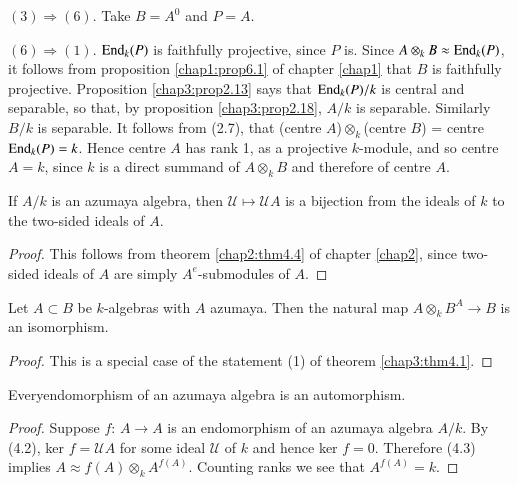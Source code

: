   $(3) \Rightarrow (6)$. Take $B =A^0$ and $P=A$.
  
  $(6) \Rightarrow (1)$. $\operatorname{End}_k (P)$ is faithfully projective, since
  $P$ is. Since $A \otimes_k B \approx \operatorname{End}_k (P)$, it follows from
  proposition \ref{chap1:prop6.1} of chapter \ref{chap1} that $B$ is faithfully
  projective. Proposition \ref{chap3:prop2.13} says that $\operatorname{End}_k (P)/k$
  is  central 
  and separable, so that, by proposition \ref{chap3:prop2.18}, $A/k$ is
  separable. Similarly $B/k$ is separable. It follows from (2.7),
  that (centre $A$)$\otimes_k$(centre $B$) = centre $\operatorname{End}_k
  (P)=k$. Hence centre $A$ has rank 1, as a projective $k$-module, and
  so centre $A=k$, since $k$ is a direct summand of $A  \otimes_k B$
  and therefore of centre $A$. 
  
\setcounter{coro}{1}
  \begin{coro}%
If $A/k$ is an azumaya algebra, then $\mathscr{U} \mapsto \mathscr{U}
A$ is a bijection from the ideals of $k$ to the two-sided ideals of
$A$. 
\end{coro}   

   \begin{proof}%
This follows from theorem \ref{chap2:thm4.4} of chapter \ref{chap2},
since two-sided ideals of $A$ are simply $A^e$-submodules of $A$.  
   \end{proof}   

   \begin{coro} %
Let $A \subset B$ be $k$-algebras with $A$ azumaya. Then the natural
map $A \otimes_k B^A \to B$ is an isomorphism. 
   \end{coro}   

   \begin{proof}%
This is a special case of the statement (1) of theorem \ref{chap3:thm4.1}. 
   \end{proof}   

\begin{coro}%
Every\pageoriginale endomorphism of an azumaya algebra is an automorphism. 
\end{coro}   

\begin{proof}%
Suppose $f$: $A \to A$ is an endomorphism of an azumaya algebra
$A/k$. By (4.2), ker $f = \mathscr{U} A$ for some ideal $\mathscr{U}$
of  $k$ and hence ker $f=0$. Therefore (4.3) implies $A \approx f (A)
\otimes_k A^{f (A)}$. Counting ranks we see that $A^{f(A)}=k$. 
\end{proof}   

